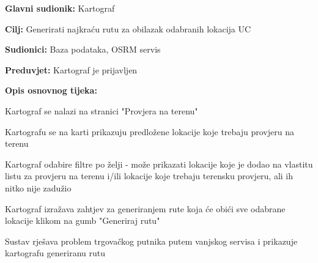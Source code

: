 					\noindent {}
					\begin{packed_item}
	
						\item \textbf{Glavni sudionik: }Kartograf
						\item  \textbf{Cilj:} Generirati najkraću rutu za obilazak odabranih lokacija
UC						\item  \textbf{Sudionici:} Baza podataka, OSRM servis
						\item  \textbf{Preduvjet:} Kartograf je prijavljen
						\item  \textbf{Opis osnovnog tijeka:}
						
						\item[] \begin{packed_enum}
	
							\item Kartograf se nalazi na stranici "Provjera na terenu"
							\item Kartografu se na karti prikazuju predložene lokacije koje trebaju provjeru na terenu
							\item Kartograf odabire filtre po želji - može prikazati lokacije koje je dodao na vlastitu listu za provjeru na terenu i/ili lokacije koje trebaju terensku provjeru, ali ih nitko nije zadužio
							\item Kartograf izražava zahtjev za generiranjem rute koja će obići sve odabrane lokacije klikom na gumb "Generiraj rutu"
							\item Sustav rješava problem trgovačkog putnika putem vanjskog servisa i prikazuje kartografu generiranu rutu
							
						\end{packed_enum}
						
					\end{packed_item}
					

